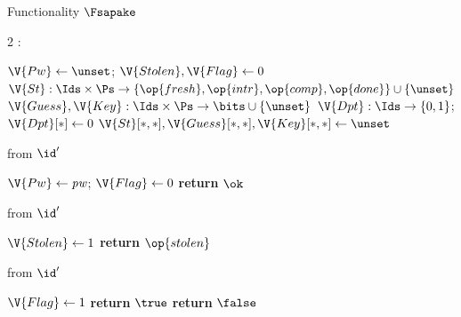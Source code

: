 \begin{interface}[nofloat]{Functionality $\Fsapake$ \\
}

{\scriptsize
\setlength{\columnsep}{1.4em}
\begin{multicols}{2}
:
\begin{algorithmic}[1]
\setcounter{contline}{0}\algcont
\State $\V{Pw} \gets \unset$; \quad $\V{Stolen}, \V{Flag} \gets 0$
\State $\V{St} : \Ids \times \Ps \to \{\op{fresh}, \op{intr}, \op{comp}, \op{done}\} \cup \{\unset\}$
\State $\V{Guess}, \V{Key} : \Ids \times \Ps \to \bits \cup \{\unset\}$
\State $\V{Dpt} : \Ids \to \{0,1\}$; \quad $\V{Dpt}[*] \gets 0$
\State $\V{St}[*,*], \V{Guess}[*,*], \V{Key}[*,*] \gets \unset$
\algsave
\end{algorithmic}
\vspace{1.4ex}

 \quad from $\id'$
\begin{algorithmic}[1]
\algcont
{}
\State $\V{Pw} \gets \mathit{pw}$; \quad $\V{Flag} \gets 0$ \label{ln:sapakeflag}
\State \textbf{return} $\ok$
\algsave
\end{algorithmic}
\vspace{1.4ex}

 \quad from $\id'$
\begin{algorithmic}[1]
\algcont
{}
\State $\V{Stolen} \gets 1$
\State \textbf{return} $\op{stolen}$ \label{ln:sapakesteal}
\algsave
\end{algorithmic}
\vspace{1.4ex}

 \quad from $\id'$
\begin{algorithmic}[1]
\algcont
{} \label{ln:sapakeafter}
  \State $\V{Flag} \gets 1$
  \State \textbf{return} $\true$
\EndIf
\State \textbf{return} $\false$
\algsave
\end{algorithmic}
\vspace{1.4ex}


\end{multicols}}
\end{interface}
